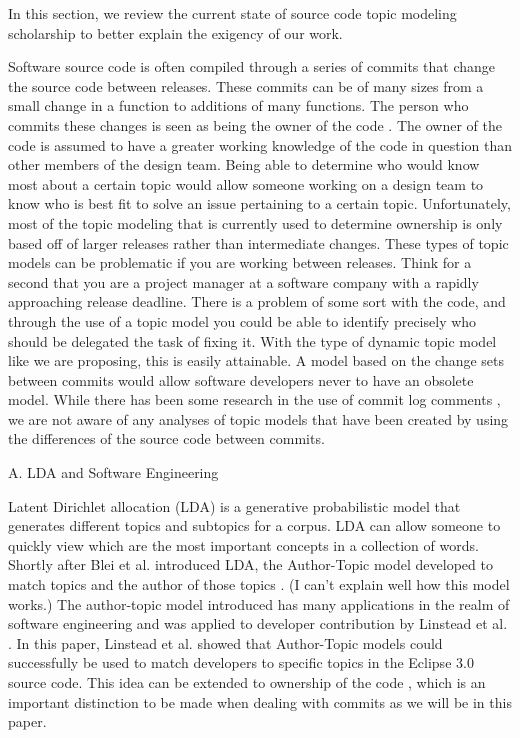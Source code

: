 In this section, we review the current state of source code topic modeling scholarship to better explain the exigency of our work.

Software source code is often compiled through a series of commits that change the source code between releases. These commits can be of many sizes from a small change in a function to additions of many functions. The person who commits these changes is seen as being the owner of the code \cite{Corley2012}. The owner of the code is assumed to have a greater working knowledge of the code in question than other members of the design team. Being able to determine who would know most about a certain topic would allow someone working on a design team to know who is best fit to solve an issue pertaining to a certain topic. Unfortunately, most of the topic modeling that is currently used to determine ownership is only based off of larger releases rather than intermediate changes. These types of topic models can be problematic if you are working between releases. Think for a second that you are a project manager at a software company with a rapidly approaching release deadline. There is a problem of some sort with the code, and through the use of a topic model you could be able to identify precisely who should be delegated the task of fixing it. With the type of dynamic topic model like we are proposing, this is easily attainable. A model based on the change sets between commits would allow software developers never to have an obsolete model. While there has been some research in the use of commit log comments \cite{Hindle2009}, we are not aware of any analyses of topic models that have been created by using the differences of the source code between commits.

A. LDA and Software Engineering

Latent Dirichlet allocation (LDA) \cite{Blei2003} is a generative probabilistic model that generates different topics and subtopics for a corpus. LDA can allow someone to quickly view which are the most important concepts in a collection of words. Shortly after Blei et al. introduced LDA, the Author-Topic model developed to match topics and the author of those topics \cite{Rosen-Zvi2004} \cite{Steyvers2004}. (I can't explain well how this model works.) The author-topic model introduced has many applications in the realm of software engineering and was applied to developer contribution by Linstead et al. \cite{Linstead2007}. In this paper, Linstead et al. showed that Author-Topic models could successfully be used to match developers to specific topics in the Eclipse 3.0 source code. This idea can be extended to ownership of the code \cite{Corley2012}, which is an important distinction to be made when dealing with commits as we will be in this paper.

